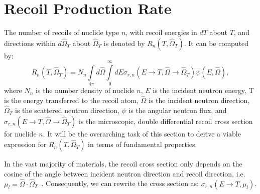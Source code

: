 \documentclass[review]{elsarticle}
\begin{document}
\section{Recoil Production Rate}
The number of recoils of nuclide type $n$, with recoil energies in $dT$ about $T$, and directions within $d \hat{\Omega}_T$ about $\hat{\Omega}_T$ is denoted by $R_n(T,\hat{\Omega}_T)$. 
It can be computed by:
\begin{equation}
	R_n(T,\hat{\Omega}_T) = N_n  \int\limits_{4\pi} d \hat{\Omega} \int\limits_0^\infty dE  \sigma_{r,n}(E \rightarrow T, \hat{\Omega} \rightarrow \hat{\Omega}_T) \psi(E, \hat{\Omega}),
\label{eq:rate}
\end{equation}
where $N_n$ is the number density of nuclide $n$, $E$ is the incident neutron energy, T is the energy transferred to the recoil atom, $\hat{\Omega}$ is the incident neutron direction, $\hat{\Omega}_T$ is the scattered neutron direction, $\psi$ is the angular neutron flux, and $\sigma_{r,n}(E \rightarrow T, \hat{\Omega} \rightarrow \hat{\Omega}_T)$ is the microscopic, double differential recoil cross section for nuclide $n$. It will be the overarching task of this section to derive a viable expression for $R_n(T,\hat{\Omega}_T)$ in terms of fundamental properties.

In the vast majority of materials, the recoil cross section only depends on the cosine of the angle between incident neutron direction and recoil direction, i.e. $\mu_l =\hat{\Omega} \cdot \hat{\Omega}_T$~\cite{lewis1984}. Consequently, we can rewrite the cross section as: $\sigma_{r,n}(E \rightarrow T, \mu_l)$.
\end{document}
